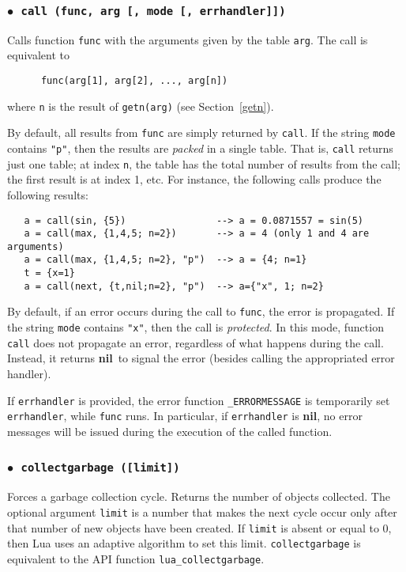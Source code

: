 \documentclass[11pt]{article}
\newcommand{\See}[1]{Section~\ref{#1}}
\newcommand{\see}[1]{(see \See{#1})}
\newcommand{\T}[1]{{\tt #1}}
\newcommand{\nil}{{\bf nil}}
\newcommand{\Deffunc}[1]{\index{#1}}
\newcommand{\ff}{$\bullet$\ }
\begin{document}
\subsubsection*{\ff \T{call (func, arg [, mode [, errhandler]])}}\Deffunc{call}
\label{pdf-call}
Calls function \verb|func| with
the arguments given by the table \verb|arg|.
The call is equivalent to
\begin{verbatim}
      func(arg[1], arg[2], ..., arg[n])
\end{verbatim}
where \verb|n| is the result of \verb|getn(arg)| \see{getn}.

By default,
all results from \verb|func| are simply returned by \verb|call|.
If the string \verb|mode| contains \verb|"p"|,
then the results are \emph{packed} in a single table.
That is, \verb|call| returns just one table;
at index \verb|n|, the table has the total number of results
from the call;
the first result is at index 1, etc.
For instance, the following calls produce the following results:
\begin{verbatim}
   a = call(sin, {5})                --> a = 0.0871557 = sin(5)
   a = call(max, {1,4,5; n=2})       --> a = 4 (only 1 and 4 are arguments)
   a = call(max, {1,4,5; n=2}, "p")  --> a = {4; n=1}
   t = {x=1}
   a = call(next, {t,nil;n=2}, "p")  --> a={"x", 1; n=2}
\end{verbatim}

By default,
if an error occurs during the call to \verb|func|,
the error is propagated.
If the string \verb|mode| contains \verb|"x"|,
then the call is \emph{protected}.
In this mode, function \verb|call| does not propagate an error,
regardless of what happens during the call.
Instead, it returns \nil\ to signal the error
(besides calling the appropriated error handler).

If \verb|errhandler| is provided,
the error function \verb|_ERRORMESSAGE| is temporarily set \verb|errhandler|,
while \verb|func| runs.
In particular, if \verb|errhandler| is \nil,
no error messages will be issued during the execution of the called function.

\subsubsection*{\ff \T{collectgarbage ([limit])}}\Deffunc{collectgarbage}
Forces a garbage collection cycle.
Returns the number of objects collected.
The optional argument \verb|limit| is a number that
makes the next cycle occur only after that number of new
objects have been created.
If \verb|limit| is absent or equal to 0,
then Lua uses an adaptive algorithm to set this limit.
\verb|collectgarbage| is equivalent to
the API function \verb|lua_collectgarbage|.
\end{document}

